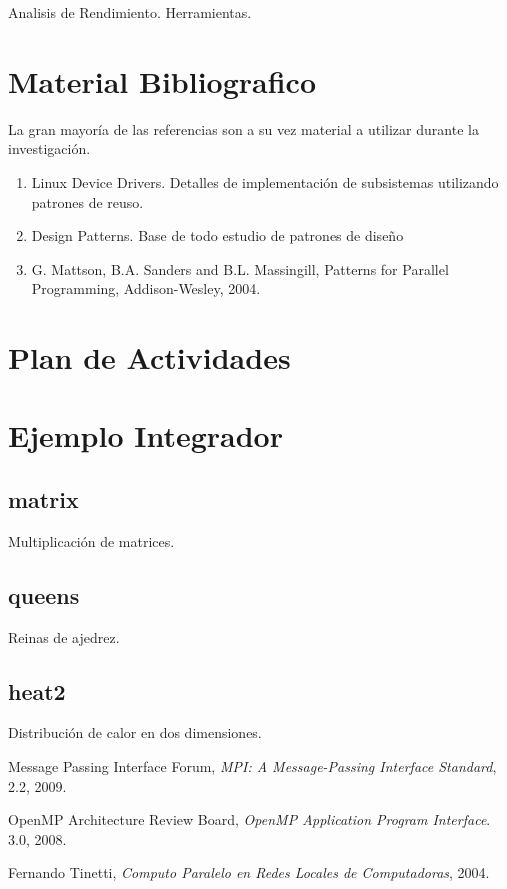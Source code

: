 \documentclass[a4paper,twocolumn]{article}
\begin{document}
Analisis de Rendimiento.
Herramientas.

\section{Material Bibliografico}

La gran mayor\'ia de las referencias son a su vez material a utilizar durante la investigaci\'on.

\begin{enumerate}
\item{Linux Device Drivers}. Detalles de implementaci\'on de subsistemas utilizando patrones de reuso.
\item{Design Patterns}. Base de todo estudio de patrones de dise\~no
\item{G. Mattson, B.A. Sanders and B.L. Massingill, Patterns for Parallel Programming, Addison-Wesley, 2004}.
\end{enumerate}

\section{Plan de Actividades}

\appendix

\section{Ejemplo Integrador}

\subsection{matrix}

Multiplicaci\'on de matrices.

\subsection{queens}

Reinas de ajedrez.

\subsection{heat2}

Distribuci\'on de calor en dos dimensiones.

\begin{thebibliography}{9}
  
  Message Passing Interface Forum,
  \emph{MPI: A Message-Passing Interface Standard},
  2.2,
  2009.

  OpenMP Architecture Review Board,
  \emph{OpenMP Application Program Interface}.
  3.0,
  2008.

  Fernando Tinetti,
  \emph{Computo Paralelo en Redes Locales de Computadoras},
  2004.

\end{thebibliography}
\end{document}
